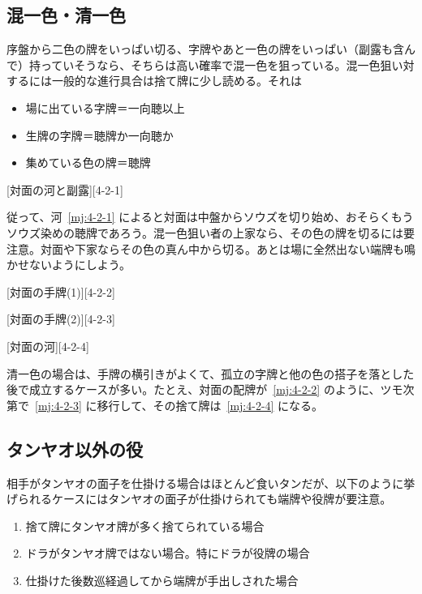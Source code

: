 \documentclass[../nankiru_main.tex]{subfiles}
\begin{document}
\subsection{混一色・清一色}

序盤から二色の牌をいっぱい切る、字牌やあと一色の牌をいっぱい（副露も含んで）持っていそうなら、そちらは高い確率で混一色を狙っている\citep[][pp.~47--50]{takizawa-yomi}。混一色狙い対するには一般的な進行具合は捨て牌に少し読める。それは

\begin{itemize}
  \item 場に出ている字牌＝一向聴以上
  \item 生牌の字牌＝聴牌か一向聴か
  \item 集めている色の牌＝聴牌
\end{itemize}

[対面の河と副露][4-2-1]

従って、河~\ref{mj:4-2-1} によると対面は中盤からソウズを切り始め、おそらくもうソウズ染めの聴牌であろう。混一色狙い者の上家なら、その色の牌を切るには要注意。対面や下家ならその色の真ん中から切る。あとは場に全然出ない端牌も鳴かせないようにしよう。

[対面の手牌(1)][4-2-2]

[対面の手牌(2)][4-2-3]

[対面の河][4-2-4]

清一色の場合は、手牌の横引きがよくて、孤立の字牌と他の色の搭子を落とした後で成立するケースが多い\citep[][pp.~55--57]{takizawa-yomi}。たとえ、対面の配牌が~\ref{mj:4-2-2} のように、ツモ次第で~\ref{mj:4-2-3} に移行して、その捨て牌は~\ref{mj:4-2-4} になる。

\subsection{タンヤオ以外の役}

相手がタンヤオの面子を仕掛ける場合はほとんど食いタンだが、以下のように挙げられるケースにはタンヤオの面子が仕掛けられても端牌や役牌が要注意\citep[][pp.~58--63]{takizawa-yomi}。

\begin{enumerate}
  \item 捨て牌にタンヤオ牌が多く捨てられている場合
  \item ドラがタンヤオ牌ではない場合。特にドラが役牌の場合
  \item 仕掛けた後数巡経過してから端牌が手出しされた場合
\end{enumerate}
\end{document}

